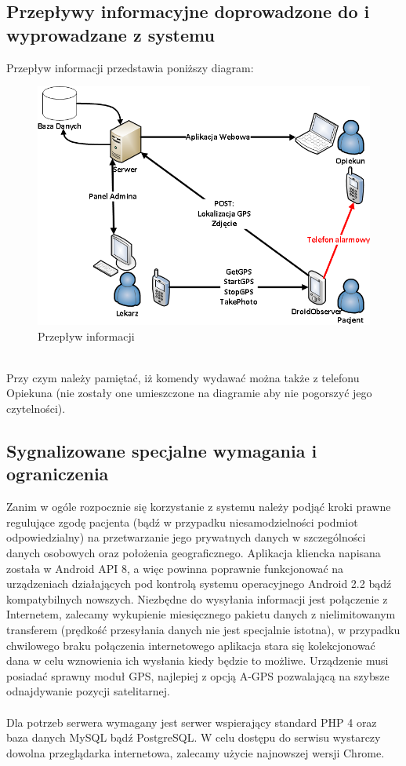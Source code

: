 \documentclass[11pt,a4paper]{article}
\begin{document}
\subsection {Przepływy informacyjne doprowadzone do i wyprowadzane z systemu}
Przepływ informacji przedstawia poniższy diagram:\\
  \begin{figure}[h]
    \includegraphics[scale=0.5]{data_flow.png}
    \caption{Przepływ informacji}
  \end{figure}
\\Przy czym należy pamiętać, iż komendy wydawać można także z telefonu Opiekuna (nie zostały one umieszczone na diagramie aby nie pogorszyć jego czytelności).
\subsection {Sygnalizowane specjalne wymagania i ograniczenia}
Zanim w ogóle rozpocznie się korzystanie z systemu należy podjąć kroki prawne regulujące zgodę pacjenta (bądź w przypadku niesamodzielności podmiot odpowiedzialny) na przetwarzanie jego prywatnych danych w szczególności danych osobowych oraz położenia geograficznego. Aplikacja kliencka napisana została w Android API 8, a więc powinna poprawnie funkcjonować na urządzeniach działających pod kontrolą systemu operacyjnego Android 2.2 bądź kompatybilnych nowszych. Niezbędne do wysyłania informacji jest połączenie z Internetem, zalecamy wykupienie miesięcznego pakietu danych z nielimitowanym transferem (prędkość przesyłania danych nie jest specjalnie istotna), w przypadku chwilowego braku połączenia internetowego aplikacja stara się kolekcjonować dana w celu wznowienia ich wysłania kiedy będzie to możliwe. Urządzenie musi posiadać sprawny moduł GPS, najlepiej z opcją A-GPS pozwalającą na szybsze odnajdywanie pozycji satelitarnej.\\
\\
Dla potrzeb serwera wymagany jest serwer wspierający standard PHP 4 oraz baza danych MySQL bądź PostgreSQL. W celu dostępu do serwisu wystarczy dowolna przeglądarka internetowa, zalecamy użycie najnowszej wersji Chrome.
\end{document}
